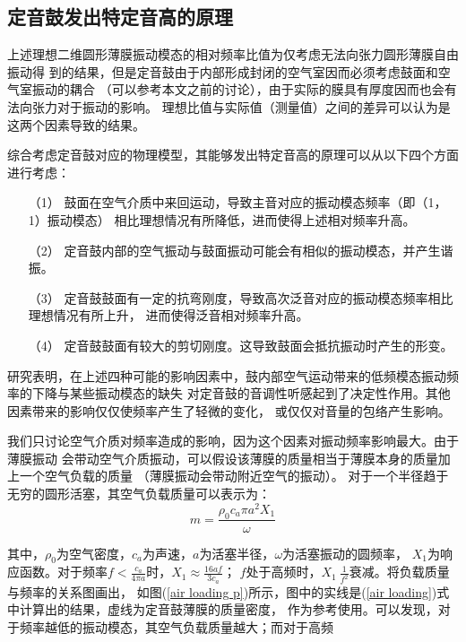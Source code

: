 \documentclass[a4paper]{ctexart}
\begin{document}
	\subsection{定音鼓发出特定音高的原理}
	\par 
	上述理想二维圆形薄膜振动模态的相对频率比值为仅考虑无法向张力圆形薄膜自由振动得
	到的结果，但是定音鼓由于内部形成封闭的空气室因而必须考虑鼓面和空气室振动的耦合
	（可以参考本文之前的讨论），由于实际的膜具有厚度因而也会有法向张力对于振动的影响。
	理想比值与实际值（测量值）之间的差异可以认为是这两个因素导致的结果。
	\par 
	综合考虑定音鼓对应的物理模型，其能够发出特定音高的原理可以从以下四个方面进行考虑\cite{a}：
	\begin{itemize}
		\item[（1）]
		鼓面在空气介质中来回运动，导致主音对应的振动模态频率（即（1，1）振动模态）
		相比理想情况有所降低，进而使得上述相对频率升高。
		\item[（2）]
		定音鼓内部的空气振动与鼓面振动可能会有相似的振动模态，并产生谐振。
		\item[（3）]
		定音鼓鼓面有一定的抗弯刚度，导致高次泛音对应的振动模态频率相比理想情况有所上升，
		进而使得泛音相对频率升高。
		\item[（4）]
		定音鼓鼓面有较大的剪切刚度。这导致鼓面会抵抗振动时产生的形变。
	\end{itemize}
	\par 
	研究表明，在上述四种可能的影响因素中，鼓内部空气运动带来的低频模态振动频率的下降与某些振动模态的缺失
	对定音鼓的音调性听感起到了决定性作用。其他因素带来的影响仅仅使频率产生了轻微的变化，
	或仅仅对音量的包络产生影响。
	\par 
	我们只讨论空气介质对频率造成的影响，因为这个因素对振动频率影响最大。由于薄膜振动
	会带动空气介质振动，可以假设该薄膜的质量相当于薄膜本身的质量加上一个空气负载的质量
	（薄膜振动会带动附近空气的振动）。
	对于一个半径趋于无穷的圆形活塞，其空气负载质量可以表示为：
	\begin{equation}
		m = \frac{\rho_{0}c_{a}\pi a^{2}X_1}{\omega}
		\label{air loading}
	\end{equation}
	\par 
	其中，$\rho_0$为空气密度，$c_a$为声速，$a$为活塞半径，$\omega$为活塞振动的圆频率，
	$X_1$为响应函数。对于频率$f < \frac{c_{a}}{4\pi a}$时，$X_1\approx\frac{16af}{3c_a}$；
	$f$处于高频时，$X_{1}~\frac{1}{f^2}$衰减。将负载质量与频率的关系图画出，
	如图(\ref{air loading p})所示，图中的实线是(\ref{air loading})式中计算出的结果，虚线为定音鼓薄膜的质量密度，
	作为参考使用。可以发现，对于频率越低的振动模态，其空气负载质量越大；而对于高频
\end{document}
